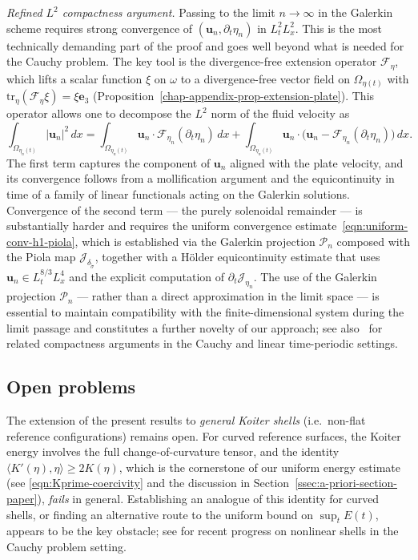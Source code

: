 \documentclass[10pt,a4paper]{article}
\numberwithin{equation}{section}
\begin{document}
\medskip
\noindent\textit{Refined $L^2$ compactness argument.} Passing to the limit $n\to\infty$
in the Galerkin scheme requires strong convergence of $(\mathbf{u}_n, \partial_t\eta_n)$
in $L^2_t L^2_x$. This is the most technically demanding part of the proof and goes
well beyond what is needed for the Cauchy problem. The key tool is the divergence-free
extension operator $\mathcal{F}_\eta$, which lifts a scalar function $\xi$ on $\omega$
to a divergence-free vector field on $\Omega_{\eta(t)}$ with $\text{tr}_\eta(\mathcal{F}_\eta\xi)
= \xi\mathbf{e}_3$ (Proposition~\ref{chap-appendix-prop-extension-plate}). This operator
allows one to decompose the $L^2$ norm of the fluid velocity as
\[
\int_{\Omega_{\eta_n(t)}} |\mathbf{u}_n|^2\,dx
= \int_{\Omega_{\eta_n(t)}} \mathbf{u}_n \cdot \mathcal{F}_{\eta_n}(\partial_t\eta_n)\,dx
+ \int_{\Omega_{\eta_n(t)}} \mathbf{u}_n \cdot
  \bigl(\mathbf{u}_n - \mathcal{F}_{\eta_n}(\partial_t\eta_n)\bigr)\,dx.
\]
The first term captures the component of $\mathbf{u}_n$ aligned with the plate velocity,
and its convergence follows from a mollification argument and the equicontinuity in time
of a family of linear functionals acting on the Galerkin solutions.
Convergence of the second term — the purely solenoidal remainder — is substantially
harder and requires the uniform convergence estimate~\eqref{eqn:uniform-conv-h1-piola},
which is established via the Galerkin projection $\mathcal{P}_n$ composed with the
Piola map $\mathcal{J}_{\delta_{\tilde\sigma}}$, together with a H\"{o}lder
equicontinuity estimate that uses $\mathbf{u}_n \in L^{8/3}_t L^4_x$ and the explicit
computation of $\partial_t \mathcal{J}_{\eta_n}$. The use of the Galerkin projection
$\mathcal{P}_n$ — rather than a direct approximation in the limit space — is essential
to maintain compatibility with the finite-dimensional system during the limit passage
and constitutes a further novelty of our approach; see also~\cite{MS22, LR14} for
related compactness arguments in the Cauchy and linear time-periodic settings.

\subsection{Open problems}

The extension of the present results to \emph{general Koiter shells}
(i.e.\ non-flat reference configurations) remains open. For curved reference surfaces,
the Koiter energy involves the full change-of-curvature tensor, and the identity
$\langle K'(\eta),\eta\rangle \ge 2K(\eta)$, which is the cornerstone of our uniform
energy estimate (see \eqref{eqn:Kprime-coercivity} and the discussion in
Section~\ref{ssec:a-priori-section-paper}), \emph{fails} in general.
Establishing an analogue of this identity for curved shells, or finding an alternative
route to the uniform bound on $\sup_t E(t)$, appears to be the key obstacle;
see \cite{KamSchSpe23} for recent progress on nonlinear shells in the Cauchy problem setting.
\end{document}
